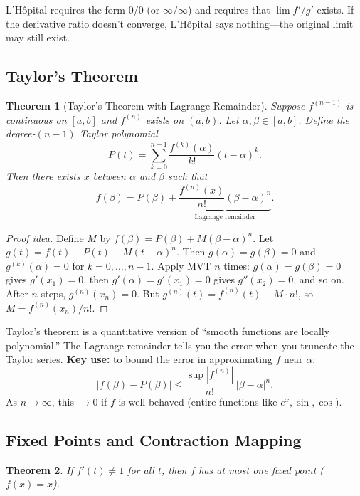 \documentclass[11pt]{article}
\theoremstyle{myplain}
\newtheorem{theorem}{Theorem}[section]
\theoremstyle{definition}
\theoremstyle{remark}
\begin{document}
\begin{watchout}
L'H\^opital requires the form $0/0$ (or $\infty/\infty$) and requires that $\lim f'/g'$ exists. If the derivative ratio doesn't converge, L'H\^opital says nothing---the original limit may still exist.
\end{watchout}

\subsection{Taylor's Theorem}

\begin{theorem}[Taylor's Theorem with Lagrange Remainder]
Suppose $f^{(n-1)}$ is continuous on $[a,b]$ and $f^{(n)}$ exists on $(a,b)$. Let $\alpha, \beta \in [a,b]$. Define the degree-$(n-1)$ Taylor polynomial
$$P(t) = \sum_{k=0}^{n-1} \frac{f^{(k)}(\alpha)}{k!}(t - \alpha)^k.$$
Then there exists $x$ between $\alpha$ and $\beta$ such that
$$f(\beta) = P(\beta) + \underbrace{\frac{f^{(n)}(x)}{n!}(\beta - \alpha)^n}_{\text{Lagrange remainder}}.$$
\end{theorem}

\begin{proof}[Proof idea]
Define $M$ by $f(\beta) = P(\beta) + M(\beta-\alpha)^n$. Let $g(t) = f(t) - P(t) - M(t-\alpha)^n$. Then $g(\alpha) = g(\beta) = 0$ and $g^{(k)}(\alpha) = 0$ for $k = 0, \ldots, n-1$. Apply MVT $n$ times: $g(\alpha) = g(\beta) = 0$ gives $g'(x_1) = 0$, then $g'(\alpha) = g'(x_1) = 0$ gives $g''(x_2) = 0$, and so on. After $n$ steps, $g^{(n)}(x_n) = 0$. But $g^{(n)}(t) = f^{(n)}(t) - M \cdot n!$, so $M = f^{(n)}(x_n)/n!$.
\end{proof}

\begin{insight}
Taylor's theorem is a quantitative version of ``smooth functions are locally polynomial.'' The Lagrange remainder tells you the error when you truncate the Taylor series. \textbf{Key use:} to bound the error in approximating $f$ near $\alpha$:
$$|f(\beta) - P(\beta)| \leq \frac{\sup|f^{(n)}|}{n!}\,|\beta - \alpha|^n.$$
As $n \to \infty$, this $\to 0$ if $f$ is well-behaved (entire functions like $e^x, \sin, \cos$).
\end{insight}

\subsection{Fixed Points and Contraction Mapping}

\begin{theorem}
If $f'(t) \neq 1$ for all $t$, then $f$ has at most one fixed point ($f(x) = x$).
\end{theorem}
\end{document}

